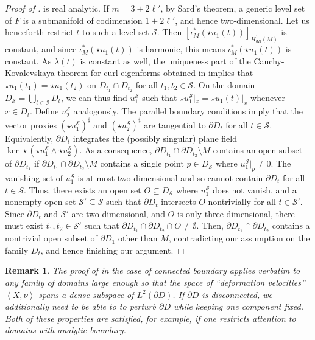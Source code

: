 \documentclass[11pt,reqno]{amsart}
\newtheorem{remark}{Remark}[section]
\begin{document}
\begin{proof}[Proof of ]
        is real analytic. If $m = 3 + 2\ell'$, by Sard's theorem, a generic level set of $F$ is a submanifold of codimension $1 + 2\ell'$, and hence two-dimensional. Let us henceforth restrict $t$ to such a level set $\mathcal S$. Then $[\iota_M^\ast (\star u_1(t))]_{H^1_{dR}(M)}$ is constant, and since $\iota_M^\ast (\star u_1(t))$ is harmonic, this means $\iota_M^\ast (\star u_1(t))$ is constant. As $\lambda(t)$ is constant as well, the uniqueness part of the Cauchy-Kovalevskaya theorem for curl eigenforms obtained in \cite[Theorem 3.1]{EncisoPeralta2012} implies that $\star u_1(t_1) = \star u_1(t_2)$ on $D_{t_1} \cap D_{t_2}$ for all $t_1, t_2 \in \mathcal S$. On the domain $D_{\mathcal S} = \bigcup_{t \in \mathcal S} D_t$, we can thus find $u_1^{\mathcal S}$ such that $\star u_1^{\mathcal S} |_{x} = \star u_1(t) |_{x}$ whenever $x \in D_t$. Define $u_2^{\mathcal S}$ analogously. The parallel boundary conditions imply that the vector proxies $(\star u_1^{\mathcal S})^\sharp$ and $(\star u_2^{\mathcal S})^\sharp$ are tangential to $\partial D_t$ for all $t \in \mathcal S$. Equivalently, $\partial D_t$ integrates the (possibly singular) plane field $\ker \star(\star u_1^{\mathcal S} \wedge \star u_2^{\mathcal S})$. As a consequence, $\partial D_{t_1} \cap \partial D_{t_2} \setminus M$ contains an open subset of $\partial D_{t_1}$ if $\partial D_{t_1} \cap \partial D_{t_2} \setminus M$ contains a single point $p \in D_{\mathcal S}$ where $u_1^{\mathcal S}|_{p} \neq 0$. The vanishing set of $u_1^{\mathcal S}$ is at most two-dimensional and so cannot contain $\partial D_t$ for all $t \in \mathcal S$. Thus, there exists an open set $O \subseteq D_{\mathcal S}$ where $u_1^{\mathcal S}$ does not vanish, and a nonempty open set $\mathcal S' \subseteq \mathcal S$ such that $\partial D_t$ intersects $O$ nontrivially for all $t \in \mathcal S'$. Since $\partial D_t$ and $\mathcal S'$ are two-dimensional, and $O$ is only three-dimensional, there must exist $t_1,t_2 \in \mathcal S'$ such that $\partial D_{t_1} \cap \partial D_{t_2} \cap O \neq \emptyset$. Then, $\partial D_{t_1} \cap \partial D_{t_2}$ contains a nontrivial open subset of $\partial D_1$ other than $M$, contradicting our assumption on the family $D_t$, and hence finishing our argument.
\end{proof}

\begin{remark}
    The proof of  in the case of connected boundary applies verbatim to any family of domains large enough so that the space of ``deformation velocities'' $\left\langle X,\nu \right\rangle$ spans a dense subspace of $L^2(\partial D)$. If $\partial D$ is disconnected, we additionally need to be able to to perturb $\partial D$ while keeping one component fixed. Both of these properties are satisfied, for example, if one restricts attention to domains with analytic boundary.
\end{remark}
\end{document}
